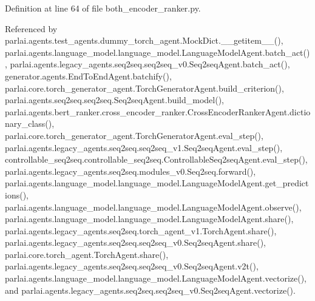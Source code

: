 Definition at line 64 of file both\+\_\+encoder\+\_\+ranker.\+py.



Referenced by parlai.\+agents.\+test\+\_\+agents.\+dummy\+\_\+torch\+\_\+agent.\+Mock\+Dict.\+\_\+\+\_\+getitem\+\_\+\+\_\+(), parlai.\+agents.\+language\+\_\+model.\+language\+\_\+model.\+Language\+Model\+Agent.\+batch\+\_\+act(), parlai.\+agents.\+legacy\+\_\+agents.\+seq2seq.\+seq2seq\+\_\+v0.\+Seq2seq\+Agent.\+batch\+\_\+act(), generator.\+agents.\+End\+To\+End\+Agent.\+batchify(), parlai.\+core.\+torch\+\_\+generator\+\_\+agent.\+Torch\+Generator\+Agent.\+build\+\_\+criterion(), parlai.\+agents.\+seq2seq.\+seq2seq.\+Seq2seq\+Agent.\+build\+\_\+model(), parlai.\+agents.\+bert\+\_\+ranker.\+cross\+\_\+encoder\+\_\+ranker.\+Cross\+Encoder\+Ranker\+Agent.\+dictionary\+\_\+class(), parlai.\+core.\+torch\+\_\+generator\+\_\+agent.\+Torch\+Generator\+Agent.\+eval\+\_\+step(), parlai.\+agents.\+legacy\+\_\+agents.\+seq2seq.\+seq2seq\+\_\+v1.\+Seq2seq\+Agent.\+eval\+\_\+step(), controllable\+\_\+seq2seq.\+controllable\+\_\+seq2seq.\+Controllable\+Seq2seq\+Agent.\+eval\+\_\+step(), parlai.\+agents.\+legacy\+\_\+agents.\+seq2seq.\+modules\+\_\+v0.\+Seq2seq.\+forward(), parlai.\+agents.\+language\+\_\+model.\+language\+\_\+model.\+Language\+Model\+Agent.\+get\+\_\+predictions(), parlai.\+agents.\+language\+\_\+model.\+language\+\_\+model.\+Language\+Model\+Agent.\+observe(), parlai.\+agents.\+language\+\_\+model.\+language\+\_\+model.\+Language\+Model\+Agent.\+share(), parlai.\+agents.\+legacy\+\_\+agents.\+seq2seq.\+torch\+\_\+agent\+\_\+v1.\+Torch\+Agent.\+share(), parlai.\+agents.\+legacy\+\_\+agents.\+seq2seq.\+seq2seq\+\_\+v0.\+Seq2seq\+Agent.\+share(), parlai.\+core.\+torch\+\_\+agent.\+Torch\+Agent.\+share(), parlai.\+agents.\+legacy\+\_\+agents.\+seq2seq.\+seq2seq\+\_\+v0.\+Seq2seq\+Agent.\+v2t(), parlai.\+agents.\+language\+\_\+model.\+language\+\_\+model.\+Language\+Model\+Agent.\+vectorize(), and parlai.\+agents.\+legacy\+\_\+agents.\+seq2seq.\+seq2seq\+\_\+v0.\+Seq2seq\+Agent.\+vectorize().

\mbox{\label{classparlai_1_1agents_1_1bert__ranker_1_1both__encoder__ranker_1_1BothEncoderRankerAgent_a3ab75f0b7e32e139b933b13b588917c4}} 
